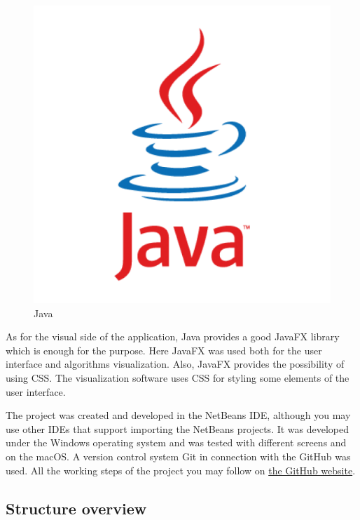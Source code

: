 \documentclass[
  field=inf,
  biblatex,
  language=english,
  glossaries,
  theorems=false,
  index
]{kidiplom}
\begin{document}
\begin{figure}[H]
\begin{center}
	
	\includegraphics[scale=0.2]{img/java_logo.png}
	\caption{Java}\label{fig:java}
\end{center}
\end{figure}

As for the visual side of the application, Java provides a good JavaFX library which is enough for the purpose. Here JavaFX was used both for the user interface and algorithms visualization. Also, JavaFX provides the possibility of using \Gls{CSS}. The visualization software uses \Gls{CSS} for styling some elements of the user interface.

The project was created and developed in the NetBeans IDE, although you may use other IDEs that support importing the NetBeans projects. It was developed under the Windows operating system and was tested with different screens and on the macOS. A version control system Git in connection with the GitHub was used. All the working steps of the project you may follow on \href{https://github.com/klnmi97/Sorting-Visualization}{the GitHub website}.

\newpage
\subsection{Structure overview}
\end{document}
